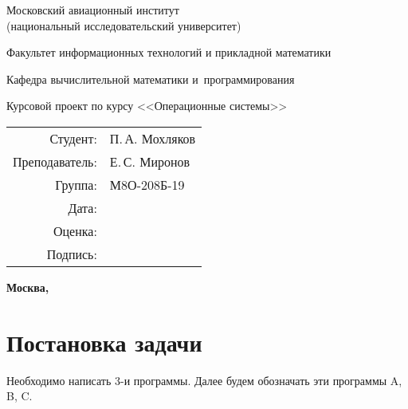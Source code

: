 \documentclass[pdf, unicode, 12pt, a4paper,oneside,fleqn]{article}
\begin{document}
\begin{titlepage}
    \begin{center}
        \bfseries

        {\Large Московский авиационный институт\\ (национальный исследовательский университет)}
        
        \vspace{48pt}
        
        {\large Факультет информационных технологий и прикладной математики}
        
        \vspace{36pt}
        
        {\large Кафедра вычислительной математики и~программирования}
        
        \vspace{48pt}
        
        Курсовой проект по курсу <<Операционные системы>>

    \end{center}
    
    \vspace{140pt}
    
    \begin{flushright}
    \begin{tabular}{rl}
    Студент: & П.\,А. Мохляков \\
    Преподаватель: & Е.\,С. Миронов \\
    Группа: & М8О-208Б-19 \\
    Дата: & \\
    Оценка: & \\
    Подпись: & \\
    \end{tabular}
    \end{flushright}
    
    \vfill
    
    \begin{center}
    \bfseries
    Москва, \the\year
    \end{center}
\end{titlepage}
    
\pagebreak

\section{Постановка задачи}

Необходимо написать 3-и программы. Далее будем обозначать эти программы A, B, C.
\end{document}
